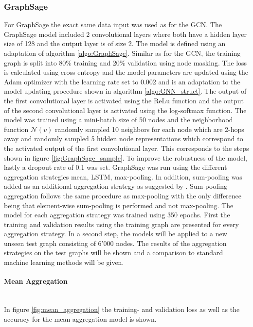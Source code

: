   \subsubsection{GraphSage}

  For GraphSage the exact same data input was used as for the GCN. The 
  GraphSage model included 2 convolutional layers where both have a hidden 
  layer size of 128 and the output layer is of size 2. The model is defined
  using an adaptation of algorithm \ref{algo:GraphSage}. Similar as for the 
  GCN, the training graph is split into 80\% training and 20\% validation using 
  node masking. The loss is calculated using cross-entropy and the model 
  parameters are updated using the Adam optimizer with the learning rate set to 
  0.002 and is an adaptation to the model updating procedure shown in 
  algorithm \ref{algo:GNN_struct}. The output of the first convolutional layer 
  is activated using the ReLu function and the output of the second 
  convolutional layer is activated using the log-softmax function. The model was 
  trained using a mini-batch size of 50 nodes and the neighborhood function 
  $\mathcal{N}(v)$ randomly sampled 10 neighbors for each node which are 2-hops 
  away and randomly sampled 5 hidden node representations which correspond to 
  the activated output of the first convolutional layer. This corresponds to 
  the steps shown in figure \ref{fig:GraphSage_sample}. To improve the 
  robustness of the model, lastly a dropout rate of 0.1 was set. GraphSage was 
  run using the different aggregation strategies mean, LSTM, max-pooling. In
  addition, sum-pooling was added as an additional aggregation strategy as
  suggested by \cite{xu2018powerful}. Sum-pooling aggregation follows the same
  procedure as max-pooling with the only difference being that element-wise
  sum-pooling is performed and not max-pooling. The model for each aggregation 
  strategy was trained using 350 epochs. First the training and validation
  results using the training graph are presented for every aggregation
  strategy. In a second step, the models will be applied to a new unseen test 
  graph consisting of 6'000 nodes. The results of the aggregation strategies on
  the test graphs will be shown and a comparison to standard machine learning
  methods will be given. 

  \paragraph{Mean Aggregation}  \mbox{}\\ 
  In figure \ref{fig:mean_aggregation} the training- and validation loss as
  well as the accuracy for the mean aggregation model is shown.

